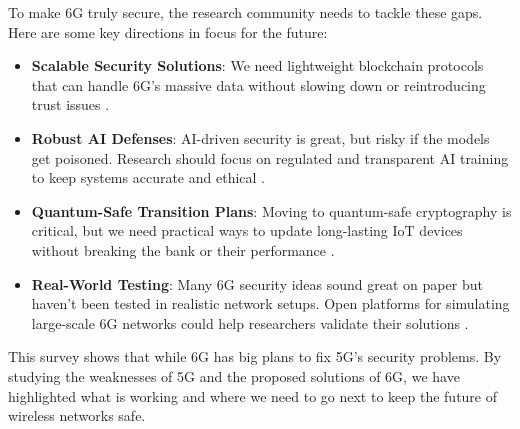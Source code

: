 \documentclass[acmtog]{acmart}
\begin{document}
To make 6G truly secure, the research community needs to tackle these gaps. Here are some key directions in focus for the future:
\begin{itemize}
  \item \textbf{Scalable Security Solutions}: We need lightweight blockchain protocols that can handle 6G’s massive data without slowing down or reintroducing trust issues \cite{ref2}.
  \item \textbf{Robust AI Defenses}: AI-driven security is great, but risky if the models get poisoned. Research should focus on regulated and transparent AI training to keep systems accurate and ethical \cite{ref5}.
  \item \textbf{Quantum-Safe Transition Plans}: Moving to quantum-safe cryptography is critical, but we need practical ways to update long-lasting IoT devices without breaking the bank or their performance \cite{ref8}.
  \item \textbf{Real-World Testing}: Many 6G security ideas sound great on paper but haven’t been tested in realistic network setups. Open platforms for simulating large-scale 6G networks could help researchers validate their solutions \cite{ref4}.
\end{itemize}
This survey shows that while 6G has big plans to fix 5G’s security problems. By studying the weaknesses of 5G and the proposed solutions of 6G, we have highlighted what is working and where we need to go next to keep the future of wireless networks safe.



\end{document}

